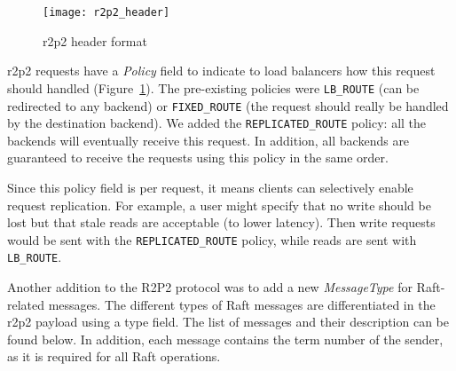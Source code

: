 \begin{figure}
    \centering
    \texttt{[image: r2p2\_header]}
    \caption{\gls{r2p2} header format\cite{r2p2}}
    \label{fig:r2p2-header}
\end{figure}


\Gls{r2p2} requests have a \emph{Policy} field to indicate to load balancers how this request should handled (Figure~\ref{fig:r2p2-header}).
The pre-existing policies were \texttt{LB\_ROUTE} (can be redirected to any backend) or \texttt{FIXED\_ROUTE} (the request should really be handled by the destination backend).
We added the \texttt{REPLICATED\_ROUTE} policy: all the backends will eventually receive this request.
In addition, all backends are guaranteed to receive the requests using this policy in the same order.

Since this policy field is per request, it means clients can selectively enable request replication.
For example, a user might specify that no write should be lost but that stale reads are acceptable (to lower latency).
Then write requests would be sent with the \texttt{REPLICATED\_ROUTE} policy, while reads are sent with \texttt{LB\_ROUTE}.

Another addition to the R2P2 protocol was to add a new \emph{MessageType} for Raft-related messages.
The different types of Raft messages are differentiated in the \gls{r2p2} payload using a type field.
The list of messages and their description can be found below.
In addition, each message contains the term number of the sender, as it is required for all Raft operations.

